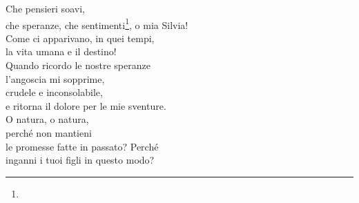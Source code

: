 \documentclass{article}
\begin{document}
\begin{vwcol}[widths={0.43,0.57},justify=flush,rule=0pt,indent=0em]
Che pensieri soavi,\\
che speranze, che sentimenti\footnote[2]{}, o mia Silvia!\\
Come ci apparivano, in quei tempi,\\
la vita umana e il destino!\\
Quando ricordo le nostre speranze\\
l'angoscia mi sopprime,\\
crudele e inconsolabile,\\
e ritorna il dolore per le mie sventure.\\
O natura, o natura,\\
perché non mantieni\\
le promesse fatte in passato? Perché\\
inganni i tuoi figli in questo modo?
\end{vwcol}
\end{document}
